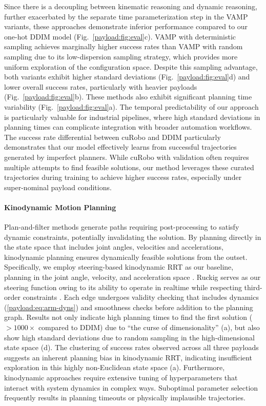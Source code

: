 Since there is a decoupling between kinematic reasoning and dynamic reasoning, further exacerbated by the separate time parameterization step in the VAMP variants, these approaches demonstrate inferior performance compared to our one-hot DDIM model (Fig.~\ref{payload:fig:eval}c).
VAMP with deterministic sampling achieves marginally higher success rates than VAMP with random sampling due to its low-dispersion sampling strategy, which provides more uniform exploration of the configuration space.
Despite this sampling advantage, both variants exhibit higher standard deviations (Fig.~\ref{payload:fig:eval}d) and lower overall success rates, particularly with heavier payloads (Fig.~\ref{payload:fig:eval}b). These methods also exhibit significant planning time variability (Fig.~\ref{payload:fig:eval}a).
The temporal predictability of our approach is particularly valuable for industrial pipelines, where high standard deviations in planning times can complicate integration with broader automation workflows.
The success rate differential between cuRobo and DDIM particularly demonstrates that our model effectively learns from successful trajectories generated by imperfect planners. While cuRobo with validation often requires multiple attempts to find feasible solutions, our method leverages these curated trajectories during training to achieve higher success rates, especially under super-nominal payload conditions.

\paragraph{Kinodynamic Motion Planning}

Plan-and-filter methods generate paths requiring post-processing to satisfy dynamic constraints, potentially invalidating the solution. By planning directly in the state space that includes joint angles, velocities and accelerations, kinodynamic planning ensures dynamically feasible solutions from the outset.
Specifically, we employ steering-based kinodynamic RRT as our baseline, planning in the joint angle, velocity, and acceleration space \cite{lavalle2001randomized}. Ruckig serves as our steering function owing to its ability to operate in realtime while respecting third-order constraints \cite{berscheid2021jerk}. Each edge undergoes validity checking that includes dynamics (\cref{payload:eq:arm-dyns}) and smoothness checks before addition to the planning graph.
Results not only indicate high planning times to find the first solution ($>1000\times$ compared to DDIM) due to ``the curse of dimensionality'' (a), but also show high standard deviations due to random sampling in the high-dimensional state space (d).
The clustering of success rates observed across all three payloads suggests an inherent planning bias in kinodynamic RRT, indicating insufficient exploration in this highly non-Euclidean state space (a).
Furthermore, kinodynamic approaches require extensive tuning of hyperparameters that interact with system dynamics in complex ways. Suboptimal parameter selection frequently results in planning timeouts or physically implausible trajectories.

